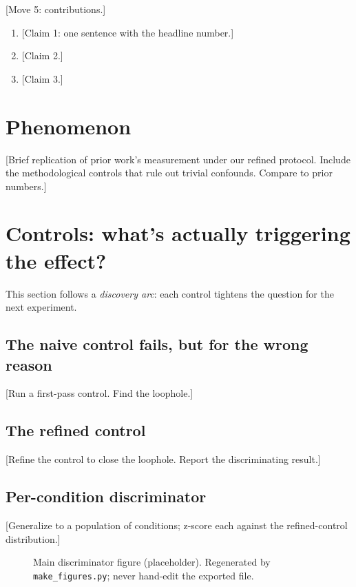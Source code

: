 \documentclass[11pt, letterpaper]{article}
\begin{document}
[Move 5: contributions.]
\begin{enumerate}[leftmargin=*, itemsep=2pt, topsep=2pt]
\item {[Claim 1: one sentence with the headline number.]}
\item {[Claim 2.]}
\item {[Claim 3.]}
\end{enumerate}

\section{Phenomenon}
\label{sec:phenomenon}

[Brief replication of prior work's measurement under our refined
protocol. Include the methodological controls that rule out trivial
confounds. Compare to prior numbers.]

\section{Controls: what's actually triggering the effect?}
\label{sec:controls}

This section follows a \emph{discovery arc}: each control tightens the
question for the next experiment.

\subsection{The naive control fails, but for the wrong reason}
[Run a first-pass control. Find the loophole.]

\subsection{The refined control}
[Refine the control to close the loophole. Report the discriminating result.]

\subsection{Per-condition discriminator}
[Generalize to a population of conditions; z-score each against the
refined-control distribution.]

\begin{figure}[t]
\centering
\caption{Main discriminator figure (placeholder). Regenerated by
\texttt{make\_figures.py}; never hand-edit the exported file.}
\label{fig:main}
\end{figure}
\end{document}
